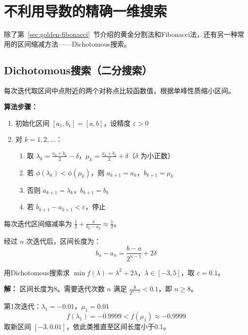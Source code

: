 \section{不利用导数的精确一维搜索}

除了第~\ref{sec:golden-fibonacci}~节介绍的黄金分割法和Fibonacci法，还有另一种常用的区间缩减方法——Dichotomous搜索。

\subsection{Dichotomous搜索（二分搜索）}\label{sec:dichotomous}

\begin{conceptbox}[基本思想]
每次迭代取区间中点附近的两个对称点比较函数值，根据单峰性质缩小区间。
\end{conceptbox}

\textbf{算法步骤：}
\begin{enumerate}
    \item 初始化区间 $[a_1, b_1] = [a, b]$，设精度 $\varepsilon > 0$
    \item 对 $k = 1, 2, \ldots$：
    \begin{enumerate}
        \item 取 $\lambda_k = \frac{a_k + b_k}{2} - \delta$，$\mu_k = \frac{a_k + b_k}{2} + \delta$（$\delta$ 为小正数）
        \item 若 $\phi(\lambda_k) < \phi(\mu_k)$，则 $a_{k+1} = a_k$，$b_{k+1} = \mu_k$
        \item 否则 $a_{k+1} = \lambda_k$，$b_{k+1} = b_k$
        \item 若 $b_{k+1} - a_{k+1} < \varepsilon$，停止
    \end{enumerate}
\end{enumerate}

\begin{notebox}[区间缩减率]
每次迭代区间缩减率为 $\frac{1}{2} + \frac{\delta}{b_k - a_k} \approx \frac{1}{2}$。

经过 $n$ 次迭代后，区间长度为：
\[
b_n - a_n = \frac{b - a}{2^{n-1}} + 2\delta
\]
\end{notebox}

\begin{example}[Dichotomous搜索]
用Dichotomous搜索求 $\min f(\lambda) = \lambda^2 + 2\lambda$，$\lambda \in [-3, 5]$，取 $\varepsilon = 0.1$。

\textbf{解：} 区间长度为8。需要迭代次数 $n$ 满足 $\frac{8}{2^{n-1}} < 0.1$，即 $n \geq 8$。

第1次迭代：$\lambda_1 = -0.01$，$\mu_1 = 0.01$
\[
f(\lambda_1) = -0.9999 < f(\mu_1) \approx -0.9999
\]
取新区间 $[-3, 0.01]$，依此类推直至区间长度小于0.1。
\end{example}

